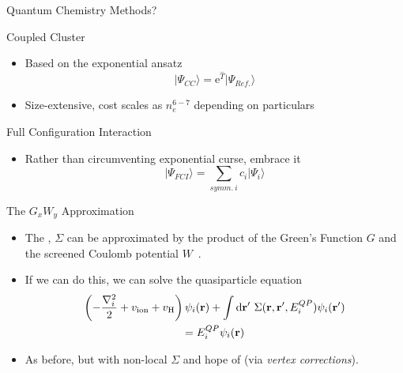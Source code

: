 \documentclass[12pt, pdf, hyperref={draft}, usenames, dvipsnames]{beamer}
\newcommand{\dd}{\mathrm{d}}
\newcommand{\e}{\mathrm{e}}
\newcommand{\ket}[1]{\lvert {#1} \rangle}
\newcommand{\blue}[1]{{\bf\color{NavyBlue}{#1}}}
\begin{document}


\begin{frame}{Quantum Chemistry Methods?}
\begin{block}{Coupled Cluster}
  \begin{itemize}
    \item Based on the exponential ansatz
    \begin{equation}
    \ket{\Psi_{CC}} = \e^{\hat T}\ket{\Psi_{Ref.}}
    \end{equation}
    \item Size-extensive, cost scales as $n_{e}^{6-7}$ depending on particulars
  \end{itemize}

\end{block}

\begin{block}{Full Configuration Interaction}
  \begin{itemize}
    \item Rather than circumventing exponential curse, embrace it
    \begin{equation}
    \ket{\Psi_{FCI}} = \sum_{symm.\ i}c_i\ket{\Psi_i}
    \end{equation}
  \end{itemize}

\end{block}

\end{frame}



\begin{frame}{The $G_xW_y$ Approximation}{}
  \begin{itemize}
  \item The \blue{self-energy}, $\Sigma$ can be approximated by the product of
  the Green's Function $G$ and the screened Coulomb potential
  $W$~.
  \item If we can do this, we can solve the quasiparticle equation
  \begin{multline}
  \left( -\dfrac{\nabla_i^2}{2} + v_{\text{ion}} + v_{\text{H}} \right)
  \psi_i({\bf r}) + \int\dd {\bf r'}\ \Sigma({\bf r}, {\bf r'}, E^{QP}_i)
  \psi_i({\bf r'})\\ = E^{QP}_i \psi_i({\bf r})
  \end{multline}
  \item As before, but with non-local $\Sigma$ and hope of \blue{systematic
  extension} (via {\it vertex corrections}).
  \end{itemize}
\end{frame}
\end{document}
